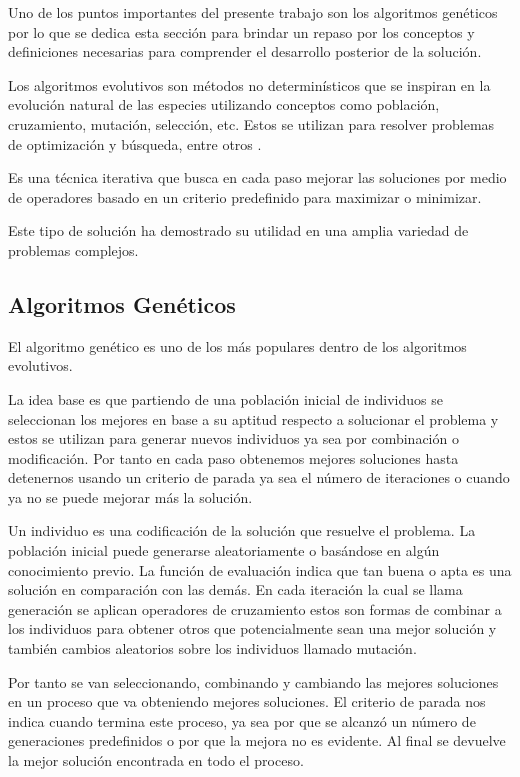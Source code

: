 Uno de los puntos importantes del presente trabajo son los algoritmos genéticos por lo que se dedica esta sección para  brindar un repaso por los conceptos y definiciones necesarias para comprender el desarrollo posterior de la solución.

Los algoritmos evolutivos son métodos no determinísticos que se inspiran en la evolución natural de las especies utilizando conceptos como población, cruzamiento, mutación, selección, etc. Estos se utilizan para resolver problemas de optimización y búsqueda, entre otros \citep{Nesmachnow2002}.

Es una técnica iterativa que busca en cada paso mejorar las soluciones por medio de operadores basado en un criterio predefinido para maximizar o minimizar.

Este tipo de solución ha demostrado su utilidad en una amplia variedad de problemas complejos.


\subsection{Algoritmos Genéticos}
El algoritmo genético es uno de los más populares dentro de los algoritmos evolutivos.

La idea base es que partiendo de una población inicial de individuos se seleccionan los mejores en base a su aptitud respecto a solucionar el problema y estos se utilizan para generar nuevos individuos ya sea por combinación o modificación. Por tanto en cada paso obtenemos mejores soluciones hasta detenernos usando un criterio de parada ya sea el número de iteraciones o cuando ya no se puede mejorar más la solución.

Un individuo es una codificación de la solución que resuelve el problema.
La población inicial puede generarse aleatoriamente o basándose en algún conocimiento previo.
La función de evaluación indica que tan buena o apta es una solución en comparación con las demás.
En cada iteración la cual se llama generación se aplican operadores de cruzamiento estos son formas de combinar a los individuos para obtener otros que potencialmente sean una mejor solución y también cambios aleatorios sobre los individuos llamado mutación.

Por tanto se van seleccionando, combinando y cambiando las mejores soluciones en un proceso que va obteniendo mejores soluciones.
El criterio de parada nos indica cuando termina este proceso, ya sea por que se alcanzó un número de generaciones predefinidos o por que la mejora no es evidente. Al final se devuelve la mejor solución encontrada en todo el proceso.

